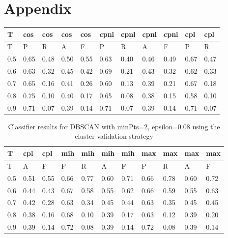 \chapter{Appendix}
\label{chapter:Appendix}





\clearpage

\begin{center}
\begin{table}[!h]
\centering
\begin{tabular}{|l|l|l|l|l|l|l|l|l|l|l|}
  \hline
T & cos & cos & cos & cos & cpnl & cpnl & cpnl & cpnl & cpl & cpl \\ 
  \hline
T & P & R & A & F & P & R & A & F & P & R \\ 
   \hline
0.5 & 0.65 & 0.48 & 0.50 & 0.55 & 0.63 & 0.40 & 0.46 & 0.49 & 0.67 & 0.47 \\ 
  0.6 & 0.63 & 0.32 & 0.45 & 0.42 & 0.69 & 0.21 & 0.43 & 0.32 & 0.62 & 0.33 \\ 
  0.7 & 0.65 & 0.16 & 0.41 & 0.26 & 0.60 & 0.13 & 0.39 & 0.21 & 0.67 & 0.18 \\ 
  0.8 & 0.75 & 0.10 & 0.40 & 0.17 & 0.65 & 0.08 & 0.38 & 0.15 & 0.58 & 0.10 \\ 
  0.9 & 0.71 & 0.07 & 0.39 & 0.14 & 0.71 & 0.07 & 0.39 & 0.14 & 0.71 & 0.07 \\ 
   \hline
\end{tabular}
\end{table}
\begin{table}[!h]
\centering
\begin{tabular}{|l|l|l|l|l|l|l|l|l|l|l|}
  \hline
T & cpl & cpl & mih & mih & mih & mih & max & max & max & max \\ 
  \hline
T & A & F & P & R & A & F & P & R & A & F \\ 
   \hline
0.5 & 0.51 & 0.55 & 0.66 & 0.77 & 0.60 & 0.71 & 0.66 & 0.78 & 0.60 & 0.72 \\ 
  0.6 & 0.44 & 0.43 & 0.67 & 0.58 & 0.55 & 0.62 & 0.66 & 0.59 & 0.55 & 0.63 \\ 
  0.7 & 0.42 & 0.28 & 0.63 & 0.34 & 0.45 & 0.44 & 0.63 & 0.35 & 0.45 & 0.45 \\ 
  0.8 & 0.38 & 0.16 & 0.68 & 0.10 & 0.39 & 0.17 & 0.63 & 0.12 & 0.39 & 0.20 \\ 
  0.9 & 0.39 & 0.14 & 0.72 & 0.08 & 0.39 & 0.14 & 0.72 & 0.08 & 0.39 & 0.14 \\ 
   \hline
\end{tabular}
\caption{Classifier results for DBSCAN with minPts=2, epsilon=0.08 using the cluster validation strategy} 
\label{}
\end{table}\end{center}
